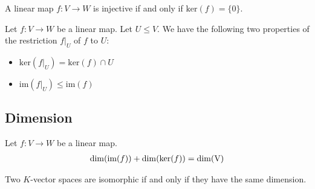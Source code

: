    
	\begin{theorem}
	    	A linear map $f:V\rightarrow W$ is injective if and only if $\text{ker}(f) = \{0\}$.
	\end{theorem}
	\begin{property}
	        Let $f:V\rightarrow W$ be a linear map. Let $U\leq V$. We have the following two properties of the restriction $f|_U$ of $f$ to $U$:
        	\begin{itemize}
			\item $\text{ker}\left(f|_U\right) = \text{ker}(f)\cap U$
        		\item $\text{im}\left(f|_U\right) \leq \text{im}(f)$
		\end{itemize}
	\end{property}
    
\subsection{Dimension}

        \begin{theorem}
		Let $f: V \rightarrow W$ be a linear map.
	        \begin{gather}
	                \label{linalgebra:dimension_theorem}
	                \dim(\text{\upshape im}(f)) + \dim(\text{\upshape ker}(f)) = \dim(\text{\upshape V})
	        \end{gather}
        \end{theorem}

        \begin{property}
		Two $K$-vector spaces are isomorphic if and only if they have the same dimension.
	\end{property}
